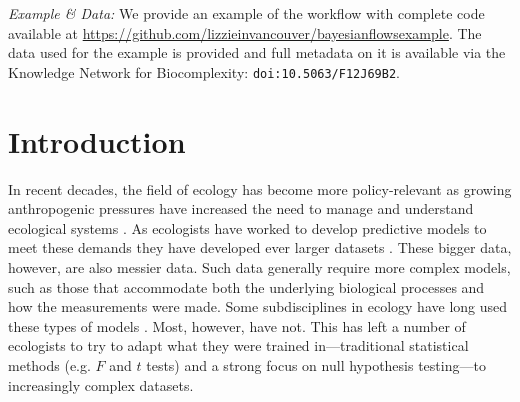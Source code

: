 \documentclass[11pt]{article}
\begin{document}
\vspace{3ex}
\noindent\emph{Example \& Data:} We provide an example of the workflow with complete code available at \url{https://github.com/lizzieinvancouver/bayesianflowsexample}.  The data used for the example is provided and full metadata on it is available via the Knowledge Network for Biocomplexity: \verb|doi:10.5063/F12J69B2|. 



\setlength{\parindent}{0pt}
\setlength{\parskip}{7pt}

\newpage

\section*{Introduction}
In recent decades, the field of ecology has become more policy-relevant as growing anthropogenic pressures have increased the need to manage and understand ecological systems  \citep{hak2016sustainable,lindenmayer2010science}. As ecologists have worked to develop predictive models to meet these demands they have developed ever larger datasets \citep{Hampton2013}. These bigger data, however, are also messier data. Such data generally require more complex models, such as those that accommodate both the underlying biological processes and how the measurements were made. Some subdisciplines in ecology have long used these types of models \citep[generally in fields focused on inferring population sizes for management,][]{muthuku2008,zheng2007,trijoulet2018,strinella2020potential}. Most, however, have not. This has left a number of ecologists to try to adapt what they were trained in---traditional statistical methods (e.g. $F$ and $t$ tests) and a strong focus on null hypothesis testing---to increasingly complex datasets. 
\end{document}
